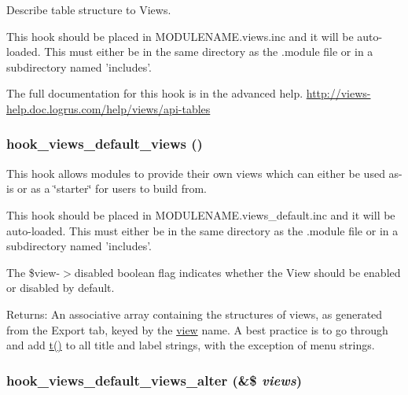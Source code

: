 Describe table structure to Views.

This hook should be placed in MODULENAME.views.inc and it will be auto-loaded. This must either be in the same directory as the .module file or in a subdirectory named 'includes'.

The full documentation for this hook is in the advanced help. \hyperlink{}{http://views-help.doc.logrus.com/help/views/api-tables} \hypertarget{group__views__hooks_g23edb74860682fa88f75cf94b97c2e15}{
\subsubsection[{hook\_\-views\_\-default\_\-views}]{\setlength{\rightskip}{0pt plus 5cm}hook\_\-views\_\-default\_\-views ()}}
\label{group__views__hooks_g23edb74860682fa88f75cf94b97c2e15}


This hook allows modules to provide their own views which can either be used as-is or as a \char`\"{}starter\char`\"{} for users to build from.

This hook should be placed in MODULENAME.views\_\-default.inc and it will be auto-loaded. This must either be in the same directory as the .module file or in a subdirectory named 'includes'.

The \$view-$>$disabled boolean flag indicates whether the View should be enabled or disabled by default.

\begin{Desc}
\item[Returns:]An associative array containing the structures of views, as generated from the Export tab, keyed by the \hyperlink{classview}{view} name. A best practice is to go through and add \hyperlink{common_8inc_41d20f0c822bf1f3c26a97981c762665}{t()} to all title and label strings, with the exception of menu strings. \end{Desc}
\hypertarget{group__views__hooks_gcd31035a6ae9c7baf05ad034d6a65768}{
\subsubsection[{hook\_\-views\_\-default\_\-views\_\-alter}]{\setlength{\rightskip}{0pt plus 5cm}hook\_\-views\_\-default\_\-views\_\-alter (\&\$ {\em views})}}
\label{group__views__hooks_gcd31035a6ae9c7baf05ad034d6a65768}


